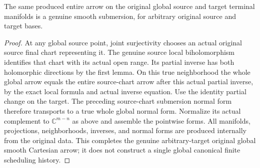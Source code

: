 \begin{theorem}
\label{hir:original-arbitrary-target-global-genuine-smooth-submersion}
\leanok
{}
The same produced entire arrow on the original global source and target
terminal manifolds is a genuine smooth submersion, for arbitrary original
source and target bases.
\end{theorem}
\begin{proof}
At any global source point, joint surjectivity chooses an actual original
source final chart representing it. The genuine source local
biholomorphism identifies that chart with its actual open range. Its
partial inverse has both holomorphic directions by the first lemma.
On this true neighborhood the whole global arrow equals the entire
source-chart arrow after this actual partial inverse, by the exact local
formula and actual inverse equation. Use the identity partial change on
the target. The preceding source-chart submersion normal form therefore
transports to a true whole global normal form. Normalize its actual
complement to $\mathbb C^{m-n}$ as above and assemble the pointwise forms.
All manifolds, projections, neighborhoods, inverses, and normal forms are
produced internally from the original data. This completes the genuine
arbitrary-target original global smooth Cartesian arrow; it does not
construct a single global canonical finite scheduling history.
\end{proof}
